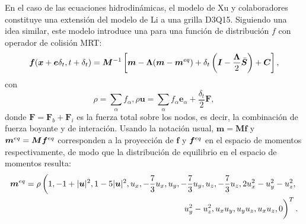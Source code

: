 En el caso de las ecuaciones hidrodin\'amicas, el modelo de Xu y colaboradores \cite{xu_three-dimensional_2015} constituye una extensi\'on del modelo de Li a una grilla D3Q15. Siguiendo una idea similar, este modelo introduce una \lbe{} para una funci\'on de distribuci\'on $f$ con operador de colisi\'on MRT:
\begin{equation}
	\bm{f} (\bm{x} + \bm{e}\delta_t, t+\delta_t) = \bm{M}^{-1}\left[ \bm{m} - \bm{\Lambda}(\bm{m} - \bm{m}^{eq})  + \delta_t \left( \bm{I} - \dfrac{\bm{\Lambda}}{2} \bar{\bm{S}} \right) + \bm{C}\right],
	\label{eq:lbe_xu}	
\end{equation}
con
\begin{subequations}
	\begin{equation}
		\rho = \sum_{\alpha} f_{\alpha},
	\end{equation}
	\begin{equation}
		\rho \bm{u} = \sum_{\alpha} f_{\alpha} \bm{e}_{\alpha} + \dfrac{\delta_t}{2}\bm{F},
	\end{equation}
\end{subequations}
donde $\bm{F} = \bm{F}_b + \bm{F}_i$ es la fuerza total sobre los nodos, es decir, la combinaci\'on de fuerza boyante y de interaci\'on. Usando la notaci\'on usual, $\bm{m} = \bm{Mf}$ y $\bm{m}^{eq} = \bm{M}\bm{f}^{eq}$ corresponden a la proyecci\'on de $\bm{f}$ y $\bm{f}^{eq}$ en el espacio de momentos respectivamente, de modo que la distribuci\'on de equilibrio en el espacio de momentos resulta:
\begin{equation}
	\begin{split}
		\feq{m} = \rho \left( 1, -1+|\bm{u}|^2, 1-5|\bm{u}|^2, u_x, -\dfrac{7}{3}u_x, u_y, -\dfrac{7}{3}u_y, u_z, -\dfrac{7}{3}u_z, 2u_x^2-u_y^2-u_z^2, \right.\\
		\left.\phantom{\dfrac{1}{1}} u_y^2 - u_z^2, u_xu_y, u_yu_z,u_xu_z,0 \right)^T	.
	\end{split}	
\end{equation}

